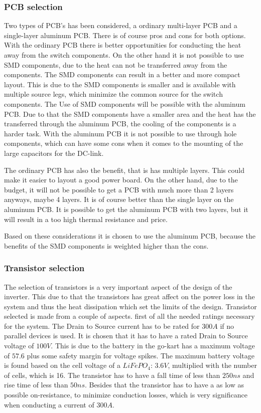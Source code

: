 \subsubsection{PCB selection}
Two types of PCB's has been considered, a ordinary multi-layer PCB and a single-layer aluminum PCB. There is of course pros and cons for both options. With the ordinary PCB there is better opportunities for conducting the heat away from the switch components. On the other hand it is not possible to use SMD components, due to the heat can not be transferred away from the components. The SMD components can result in a better and more compact layout. This is due to the SMD components is smaller and is available with multiple source legs, which minimize the common source for the switch components. The Use of SMD components will be possible with the aluminum PCB. Due to that the SMD components have a smaller area and the heat has the transferred through the aluminum PCB, the cooling of the components is a harder task. With the aluminum PCB it is not possible to use through hole components, which can have some cons when it comes to the mounting of the large capacitors for the DC-link. 

The ordinary PCB has also the benefit, that is has multiple layers. This could make it easier to layout a good power board. On the other hand, due to the budget, it will not be possible to get a PCB with much more than 2 layers anyways, maybe 4 layers. It is of course better than the single layer on the aluminum PCB. It is possible to get the aluminum PCB with two layers, but it will result in a  too high thermal resistance and price.

Based on these considerations it is chosen to use the aluminum PCB, because the benefits of the SMD components is weighted higher than the cons.


\subsubsection{Transistor selection}
The selection of transistors is a very important aspect of the design of the inverter. This due to that the transistors has great affect on the power loss in the system and thus the heat dissipation which set the limits of the design.  
Transistor selected is made from a couple of aspects. first of all the needed ratings necessary for the system. The Drain to Source current has to be rated for $300 A$ if no parallel devices is used. It is chosen that it has to have a rated Drain to Source voltage of $100 V$. This is due to the battery in the go-kart has a maximum voltage of $57.6$ plus some safety margin for voltage spikes. The maximum battery voltage is found based on the cell voltage of a $LiFePO_4$: $3.6 V$, multiplied with the number of cells, which is 16. The transistor has to have a fall time of less than $250ns$ and rise time of less than $50ns$. Besides that the transistor has to have a as low as possible on-resistance, to minimize conduction losses, which is very significance when conducting a current of $300A$.

